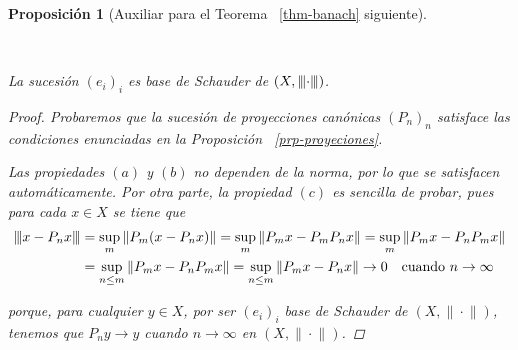 \documentclass[
  spanish,
  letterpaper,
  DIV=11,
  numbers=noendperiod]{scrreprt}
\newtheorem{proposition}[theorem]{Proposición}
\theoremstyle{definition}
\theoremstyle{remark}
\theoremstyle{definition}
\theoremstyle{exampstyle}
\newcommand{\vertiii}[1]{{\left\vert\kern-0.25ex\left\vert\kern-0.25ex\left\vert #1 
    \right\vert\kern-0.25ex\right\vert\kern-0.25ex\right\vert}}
\newcommand{\vertiii}[1]{{\left\vert\kern-0.25ex\left\vert\kern-0.25ex\left\vert #1 
    \right\vert\kern-0.25ex\right\vert\kern-0.25ex\right\vert}}
\theoremstyle{plain}
\theoremstyle{plain}
\newtheorem{proposition}{Proposición}[chapter]
\theoremstyle{definition}
\theoremstyle{plain}
\theoremstyle{remark}
\begin{document}
\begin{proposition}[Auxiliar para el Teorema ~\ref{thm-banach}
siguiente]\protect\hypertarget{prp-1.5}{}\label{prp-1.5}

~

\hspace*{1mm}

La sucesión \((e_i)_i\) es base de Schauder de \((X,\vertiii{\cdot})\).

\begin{proof}
\leavevmode

\hspace*{1cm}

Probaremos que la sucesión de proyecciones canónicas \((P_n)_n\)
satisface las condiciones enunciadas en la Proposición
~\ref{prp-proyeciones}.

Las propiedades \((a)\) y \((b)\) no dependen de la norma, por lo que se
satisfacen automáticamente. Por otra parte, la propiedad \((c)\) es
sencilla de probar, pues para cada \(x\in X\) se tiene que
\begin{align*}\label{eq:unicidad}  
        \vertiii{x-P_nx} &=\sup_{m}{\|P_m(x-P_nx)\|}=\sup_{m}{\|P_mx-P_mP_nx\|}=\sup_{m}{\|P_mx - P_nP_mx\|}\\&=\sup_{n\leq m}{\|P_mx - P_nP_mx\|}=\sup_{n\leq m}{\|P_mx - P_nx\|}\to 0\quad\text{cuando $n\to\infty$}  
\end{align*}

porque, para cualquier \(y\in X\), por ser \((e_i)_i\) base de Schauder
de \((X,\|\!\cdot\!\|)\), tenemos que \(P_ny \to y\) cuando
\(n\to\infty\) en \((X,\|\!\cdot\!\|)\).
\end{proof}

\end{proposition}
\end{document}
